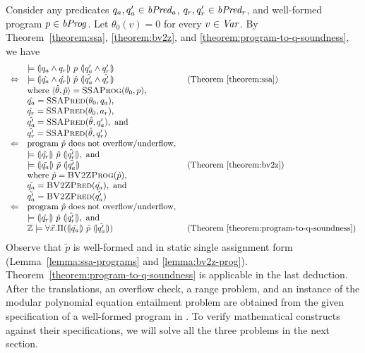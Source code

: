 
Consider any predicates $q_a, q_a' \in \mathit{bPred_a}$, $q_r, q_r' \in \mathit{bPred_r}$, and well-formed program $p \in
\mathit{bProg}$. Let $\theta_0 (v) = 0$ for every $v \in \mathit{Var}$. By
Theorem~\ref{theorem:ssa}, \ref{theorem:bv2z}, and \ref{theorem:program-to-q-soundness}, we have
\begin{equation*}
  \begin{array}{cll}
    & \models \hoaretriple{q_a \wedge q_r}{p}{q_a' \wedge q_r'}\\
    \Leftrightarrow
    & \models
      \hoaretriple{\hat{q_a} \wedge \hat{q_r}}
      {\hat{p}}
      {\hat{q_a'} \wedge \hat{q_r'}}
    & \textmd{ (Theorem~\ref{theorem:ssa})}\\
    &
      \textmd{where } \langle \hat{\theta}, \hat{p} \rangle =
      \textsc{SSAProg} (\theta_0, p), \\
    & \hat{q_a} = \textsc{SSAPred}(\theta_0, q_a), \\
    & \hat{q_r} = \textsc{SSAPred}(\theta_0, a_r), \\
    & \hat{q_a'} = \textsc{SSAPred}(\hat{\theta}, q_a'), \textmd{ and} \\
    & \hat{q_r'} = \textsc{SSAPred}(\hat{\theta}, q_r') \\
    \Leftarrow
    & \textmd{program $\hat{p}$ does not overflow/underflow}, \\
    & \models \hoaretriple{\hat{q_r}}{\hat{p}}{\hat{q_r'}}, \textmd{ and } \\
    & \models \hoaretriple{\tilde{q_a}}{\tilde{p}}{\tilde{q_a'}}
    & \textmd{ (Theorem~\ref{theorem:bv2z})} \\
    & \textmd{where } \tilde{p} = \textsc{BV2ZProg}(\hat{p}), \\
    & \tilde{q_a} = \textsc{BV2ZPred}(\hat{q_a}), \textmd{ and} \\
    & \tilde{q_a'} = \textsc{BV2ZPred}(\hat{q_a'}) \\
    \Leftarrow
    & \textmd{program $\hat{p}$ does not overflow/underflow}, \\
    & \models \hoaretriple{\hat{q_r}}{\hat{p}}{\hat{q_r'}}, \textmd{ and } \\
    & \bbfZ \models \forall \vx.
      \Pi (\hoaretriple{\tilde{q_a}}{\tilde{p}}{\tilde{q_a'}})
    & \textmd{ (Theorem~\ref{theorem:program-to-q-soundness})}
  \end{array}
\end{equation*}
Observe that $\tilde{p}$ is well-formed and in static single assignment
form (Lemma~\ref{lemma:ssa-programs} and \ref{lemma:bv2z-prog}).
Theorem~\ref{theorem:program-to-q-soundness} is applicable in the last
deduction. After the translations, an overflow check, a range problem, and an instance of the modular
polynomial equation entailment problem are obtained from the given
specification of a well-formed program in \bvdsl.
To verify mathematical constructs against their specifications, we will solve all the three problems in the next section.